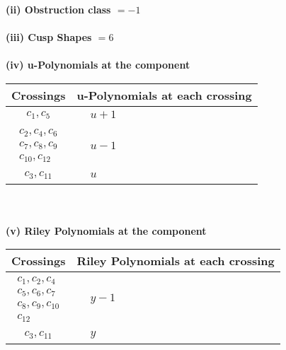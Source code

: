 \documentclass[1p]{elsarticle_modified}
\theoremstyle{definition}
\begin{document}
\flushleft \textbf{(ii) Obstruction class $= -1$}\\~\\
\flushleft \textbf{(iii) Cusp Shapes $= 6$}\\~\\
\newpage\renewcommand{\arraystretch}{1}
\flushleft \textbf{(iv) u-Polynomials at the component}\newline \\
\begin{tabular}{m{50pt}|m{274pt}}
Crossings & \hspace{64pt}u-Polynomials at each crossing \\
\hline $$\begin{aligned}c_{1},c_{5}\end{aligned}$$&$\begin{aligned}
&u+1
\end{aligned}$\\
\hline $$\begin{aligned}c_{2},c_{4},c_{6}\\c_{7},c_{8},c_{9}\\c_{10},c_{12}\end{aligned}$$&$\begin{aligned}
&u-1
\end{aligned}$\\
\hline $$\begin{aligned}c_{3},c_{11}\end{aligned}$$&$\begin{aligned}
&u
\end{aligned}$\\
\hline
\end{tabular}\\~\\
\newpage\renewcommand{\arraystretch}{1}
\flushleft \textbf{(v) Riley Polynomials at the component}\newline \\
\begin{tabular}{m{50pt}|m{274pt}}
Crossings & \hspace{64pt}Riley Polynomials at each crossing \\
\hline $$\begin{aligned}c_{1},c_{2},c_{4}\\c_{5},c_{6},c_{7}\\c_{8},c_{9},c_{10}\\c_{12}\end{aligned}$$&$\begin{aligned}
&y-1
\end{aligned}$\\
\hline $$\begin{aligned}c_{3},c_{11}\end{aligned}$$&$\begin{aligned}
&y
\end{aligned}$\\
\hline
\end{tabular}\\~\\
\end{document}
